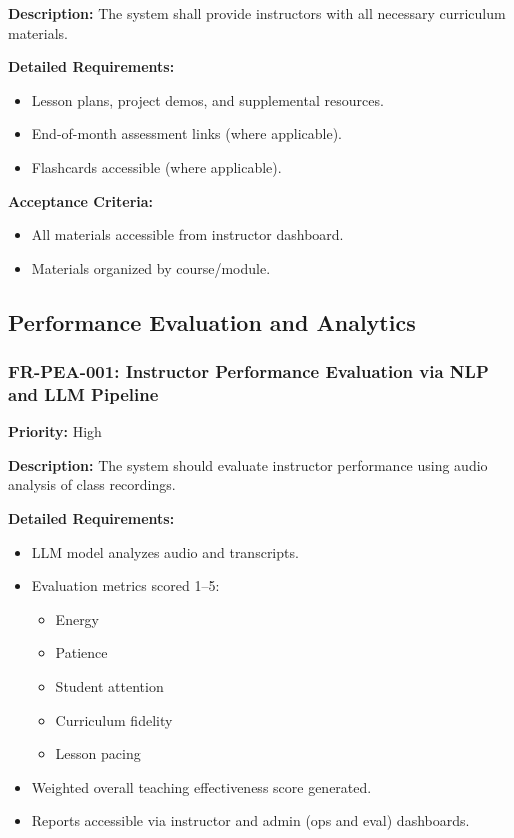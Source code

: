 \textbf{Description:} The system shall provide instructors with all necessary curriculum materials.

\textbf{Detailed Requirements:}
\begin{itemize}
    \item Lesson plans, project demos, and supplemental resources.
    \item End-of-month assessment links (where applicable).
    \item Flashcards accessible (where applicable).
\end{itemize}

\textbf{Acceptance Criteria:}
\begin{itemize}
    \item All materials accessible from instructor dashboard.
    \item Materials organized by course/module.
\end{itemize}

\subsection{Performance Evaluation and Analytics}

\subsubsection{FR-PEA-001: Instructor Performance Evaluation via NLP and LLM Pipeline}
\textbf{Priority:} High  

\textbf{Description:} The system should evaluate instructor performance using audio analysis of class recordings.

\textbf{Detailed Requirements:}
\begin{itemize}
    \item LLM model analyzes audio and transcripts.
    \item Evaluation metrics scored 1--5:
    \begin{itemize}
        \item Energy
        \item Patience
        \item Student attention
        \item Curriculum fidelity
        \item Lesson pacing
    \end{itemize}
    \item Weighted overall teaching effectiveness score generated.
    \item Reports accessible via instructor and admin (ops and eval) dashboards.
\end{itemize}

